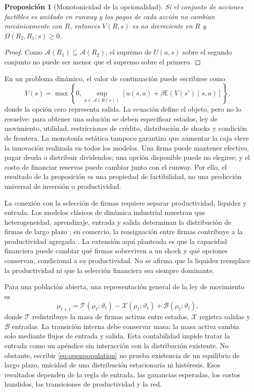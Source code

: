 \documentclass[11pt,a4paper]{article}
\newtheorem{proposition}[theorem]{Proposición}
\newcommand{\E}{\mathbb E}\newcommand{\R}{\mathcal R}\newcommand{\Prb}{\mathbb P}\newcommand{\dd}{\mathrm d}\newcommand{\1}{\mathbf 1}\newcommand{\muF}{\mu_t}
\begin{document}
\begin{proposition}[Monotonicidad de la opcionalidad]
Si el conjunto de acciones factibles es anidado en runway y los pagos de cada acción no cambian mecánicamente con $R$, entonces $V(R,s)$ es no decreciente en $R$ y $\Omega(R_2,R_1;s)\geq0$.
\end{proposition}
\begin{proof}
Como $\mathcal A(R_1)\subseteq\mathcal A(R_2)$, el supremo de $U(a,s)$ sobre el segundo conjunto no puede ser menor que el supremo sobre el primero.\end{proof}

En un problema dinámico, el valor de continuación puede escribirse como
\begin{equation}
V(s)=\max\left\{0,\sup_{a\in\mathcal A(R(s))}\left[u(s,a)+\beta\E\left(V(s')\mid s,a\right)\right]\right\}, \label{eq:bellman}
\end{equation}
donde la opción cero representa salida. La ecuación define el objeto, pero no lo resuelve: para obtener una solución se deben especificar estados, ley de movimiento, utilidad, restricciones de crédito, distribución de shocks y condición de frontera. La monotonía estática tampoco garantiza que aumentar la caja eleve la innovación realizada en todos los modelos. Una firma puede mantener efectivo, pagar deuda o distribuir dividendos; una opción disponible puede no elegirse; y el costo de financiar reservas puede cambiar junto con el runway. Por ello, el resultado de la proposición es una propiedad de factibilidad, no una predicción universal de inversión o productividad.

La conexión con la selección de firmas requiere separar productividad, liquidez y entrada. Los modelos clásicos de dinámica industrial muestran que heterogeneidad, aprendizaje, entrada y salida determinan la distribución de firmas de largo plazo \citep{jovanovic1982,hopenhayn1992}; en comercio, la reasignación entre firmas contribuye a la productividad agregada \citep{melitz2003}. La extensión aquí planteada es que la capacidad financiera puede cambiar qué firmas sobreviven a un shock y qué opciones conservan, condicional a su productividad. No se afirma que la liquidez reemplace la productividad ni que la selección financiera sea siempre dominante.

Para una población abierta, una representación general de la ley de movimiento es
\begin{equation}
\mu_{t+1}=\mathcal T(\mu_t;\vartheta_t)-\mathcal X(\mu_t;\vartheta_t)+\mathcal B(\mu_t;\vartheta_t),
\label{eq:openpopulation}
\end{equation}
donde $\mathcal T$ redistribuye la masa de firmas activas entre estados, $\mathcal X$ registra salidas y $\mathcal B$ entradas. La transición interna debe conservar masa; la masa activa cambia solo mediante flujos de entrada y salida. Esta contabilidad impide tratar la entrada como un apéndice sin interacción con la distribución existente. No obstante, escribir \eqref{eq:openpopulation} no prueba existencia de un equilibrio de largo plazo, unicidad de una distribución estacionaria ni histéresis. Esos resultados dependen de la regla de entrada, las ganancias esperadas, los costos hundidos, las transiciones de productividad y la red.
\end{document}
